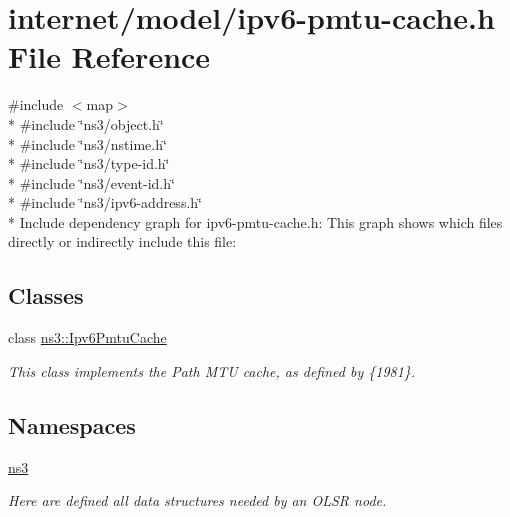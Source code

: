 \hypertarget{ipv6-pmtu-cache_8h}{}\section{internet/model/ipv6-\/pmtu-\/cache.h File Reference}
\label{ipv6-pmtu-cache_8h}
{\ttfamily \#include $<$map$>$}\\*
{\ttfamily \#include \char`\"{}ns3/object.\+h\char`\"{}}\\*
{\ttfamily \#include \char`\"{}ns3/nstime.\+h\char`\"{}}\\*
{\ttfamily \#include \char`\"{}ns3/type-\/id.\+h\char`\"{}}\\*
{\ttfamily \#include \char`\"{}ns3/event-\/id.\+h\char`\"{}}\\*
{\ttfamily \#include \char`\"{}ns3/ipv6-\/address.\+h\char`\"{}}\\*
Include dependency graph for ipv6-\/pmtu-\/cache.h\+:
This graph shows which files directly or indirectly include this file\+:
\subsection*{Classes}
\begin{DoxyCompactItemize}
\item 
class \hyperlink{classns3_1_1Ipv6PmtuCache}{ns3\+::\+Ipv6\+Pmtu\+Cache}
\begin{DoxyCompactList}\small\item\em This class implements the Path M\+TU cache, as defined by \{1981\}. \end{DoxyCompactList}\end{DoxyCompactItemize}
\subsection*{Namespaces}
\begin{DoxyCompactItemize}
\item 
 \hyperlink{namespacens3}{ns3}
\begin{DoxyCompactList}\small\item\em Here are defined all data structures needed by an O\+L\+SR node. \end{DoxyCompactList}\end{DoxyCompactItemize}

